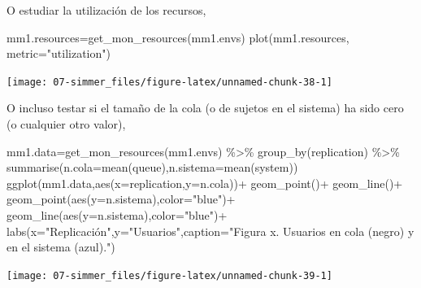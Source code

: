 \documentclass[
]{book}
\newenvironment{Shaded}{\begin{snugshade}}{\end{snugshade}}
\newcommand{\AttributeTok}[1]{\textcolor[rgb]{0.77,0.63,0.00}{#1}}
\newcommand{\FunctionTok}[1]{\textcolor[rgb]{0.00,0.00,0.00}{#1}}
\newcommand{\NormalTok}[1]{#1}
\newcommand{\OtherTok}[1]{\textcolor[rgb]{0.56,0.35,0.01}{#1}}
\newcommand{\SpecialCharTok}[1]{\textcolor[rgb]{0.00,0.00,0.00}{#1}}
\newcommand{\StringTok}[1]{\textcolor[rgb]{0.31,0.60,0.02}{#1}}
\theoremstyle{definition}
\theoremstyle{definition}
\theoremstyle{definition}
\theoremstyle{definition}
\theoremstyle{remark}
\begin{document}
O estudiar la utilización de los recursos,

\begin{Shaded}
\begin{Highlighting}[]
\NormalTok{mm1.resources}\OtherTok{=}\FunctionTok{get\_mon\_resources}\NormalTok{(mm1.envs)}
\FunctionTok{plot}\NormalTok{(mm1.resources, }\AttributeTok{metric=}\StringTok{"utilization"}\NormalTok{)}
\end{Highlighting}
\end{Shaded}

\begin{center}\texttt{[image: 07-simmer\_files/figure-latex/unnamed-chunk-38-1]} \end{center}

O incluso testar si el tamaño de la cola (o de sujetos en el sistema) ha sido cero (o cualquier otro valor),

\begin{Shaded}
\begin{Highlighting}[]
\NormalTok{mm1.data}\OtherTok{=}\FunctionTok{get\_mon\_resources}\NormalTok{(mm1.envs) }\SpecialCharTok{\%\textgreater{}\%}
  \FunctionTok{group\_by}\NormalTok{(replication) }\SpecialCharTok{\%\textgreater{}\%}
  \FunctionTok{summarise}\NormalTok{(}\AttributeTok{n.cola=}\FunctionTok{mean}\NormalTok{(queue),}\AttributeTok{n.sistema=}\FunctionTok{mean}\NormalTok{(system))}
\FunctionTok{ggplot}\NormalTok{(mm1.data,}\FunctionTok{aes}\NormalTok{(}\AttributeTok{x=}\NormalTok{replication,}\AttributeTok{y=}\NormalTok{n.cola))}\SpecialCharTok{+}
  \FunctionTok{geom\_point}\NormalTok{()}\SpecialCharTok{+}
  \FunctionTok{geom\_line}\NormalTok{()}\SpecialCharTok{+}
  \FunctionTok{geom\_point}\NormalTok{(}\FunctionTok{aes}\NormalTok{(}\AttributeTok{y=}\NormalTok{n.sistema),}\AttributeTok{color=}\StringTok{"blue"}\NormalTok{)}\SpecialCharTok{+}
  \FunctionTok{geom\_line}\NormalTok{(}\FunctionTok{aes}\NormalTok{(}\AttributeTok{y=}\NormalTok{n.sistema),}\AttributeTok{color=}\StringTok{"blue"}\NormalTok{)}\SpecialCharTok{+}
  \FunctionTok{labs}\NormalTok{(}\AttributeTok{x=}\StringTok{"Replicación"}\NormalTok{,}\AttributeTok{y=}\StringTok{"Usuarios"}\NormalTok{,}\AttributeTok{caption=}\StringTok{"Figura x. Usuarios en cola (negro) y en el sistema (azul)."}\NormalTok{)}
\end{Highlighting}
\end{Shaded}

\begin{center}\texttt{[image: 07-simmer\_files/figure-latex/unnamed-chunk-39-1]} \end{center}
\end{document}
